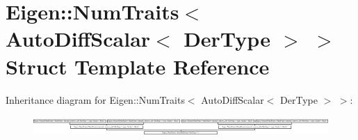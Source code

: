 \hypertarget{struct_eigen_1_1_num_traits_3_01_auto_diff_scalar_3_01_der_type_01_4_01_4}{}\section{Eigen\+:\+:Num\+Traits$<$ Auto\+Diff\+Scalar$<$ Der\+Type $>$ $>$ Struct Template Reference}
\label{struct_eigen_1_1_num_traits_3_01_auto_diff_scalar_3_01_der_type_01_4_01_4}
Inheritance diagram for Eigen\+:\+:Num\+Traits$<$ Auto\+Diff\+Scalar$<$ Der\+Type $>$ $>$\+:\begin{figure}[H]
\begin{center}
\leavevmode
\includegraphics[height=0.763636cm]{struct_eigen_1_1_num_traits_3_01_auto_diff_scalar_3_01_der_type_01_4_01_4}
\end{center}
\end{figure}
